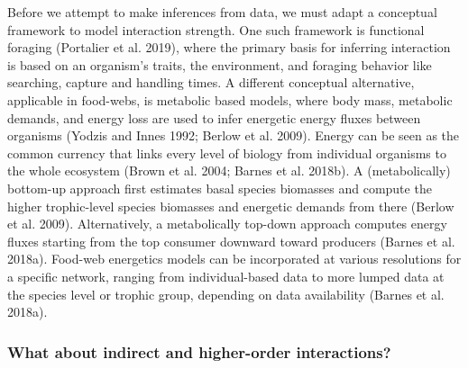 \documentclass[11pt]{article}
\begin{document}
Before we attempt to make inferences from data, we must adapt a
conceptual framework to model interaction strength. One such framework
is functional foraging (Portalier et al. 2019), where the primary basis
for inferring interaction is based on an organism's traits, the
environment, and foraging behavior like searching, capture and handling
times. A different conceptual alternative, applicable in food-webs, is
metabolic based models, where body mass, metabolic demands, and energy
loss are used to infer energetic energy fluxes between organisms (Yodzis
and Innes 1992; Berlow et al. 2009). Energy can be seen as the common
currency that links every level of biology from individual organisms to
the whole ecosystem (Brown et al. 2004; Barnes et al. 2018b). A
(metabolically) bottom-up approach first estimates basal species
biomasses and compute the higher trophic-level species biomasses and
energetic demands from there (Berlow et al. 2009). Alternatively, a
metabolically top-down approach computes energy fluxes starting from the
top consumer downward toward producers (Barnes et al. 2018a). Food-web
energetics models can be incorporated at various resolutions for a
specific network, ranging from individual-based data to more lumped data
at the species level or trophic group, depending on data availability
(Barnes et al. 2018a).

\hypertarget{what-about-indirect-and-higher-order-interactions}{%
\subsubsection{What about indirect and higher-order
interactions?}\label{what-about-indirect-and-higher-order-interactions}}
\end{document}
